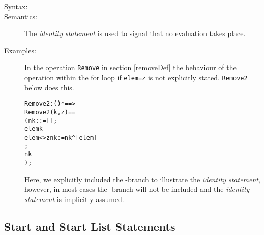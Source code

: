\documentclass[\pformat,12pt]{article}
\begin{document}
\begin{description}
\item[Syntax:]


\item[Semantics:] The {\it identity statement\/} is used to signal that no
  evaluation takes place.

\item[Examples:] In the operation \texttt{Remove} in section
  \ref{removeDef} the behaviour of the operation within the
  \textsf{for} loop if \texttt{elem=z} is not explicitly
  stated. \texttt{Remove2} below does this.
  \begin{alltt}
  Remove2 : () *  ==> 
  Remove2 (k,z) ==
    ( nk :  := [];
      elem  k 
        elem <> z  nk := nk^[elem]
       ;
      nk
    );
  \end{alltt}
  Here, we explicitly included the -branch to illustrate the
  {\it identity statement}, however, in most cases the -branch
  will not be included and the {\it identity statement\/} is implicitly
  assumed.

\end{description}

\subsection{Start and Start List Statements}\label{sec:start}
\label{sc:startstmt}
\end{document}

